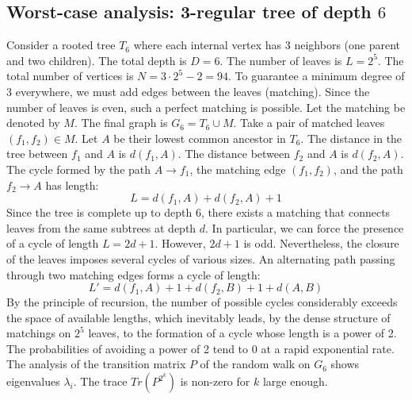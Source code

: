 \documentclass[11pt,a4paper]{article}
\begin{document}
\subsection{Worst-case analysis: 3-regular tree of depth $6$}
Consider a rooted tree $T_{6}$ where each internal vertex has 3 neighbors (one parent and two children).
The total depth is $D = 6$.
The number of leaves is $L = 2^{5}$.
The total number of vertices is $N = 3 \cdot 2^{5} - 2 = 94$.
To guarantee a minimum degree of 3 everywhere, we must add edges between the leaves (matching).
Since the number of leaves is even, such a perfect matching is possible.
Let the matching be denoted by $M$. The final graph is $G_{6} = T_{6} \cup M$.
Take a pair of matched leaves $(f_1, f_2) \in M$.
Let $A$ be their lowest common ancestor in $T_{6}$.
The distance in the tree between $f_1$ and $A$ is $d(f_1, A)$.
The distance between $f_2$ and $A$ is $d(f_2, A)$.
The cycle formed by the path $A \to f_1$, the matching edge $(f_1, f_2)$, and the path $f_2 \to A$ has length:
$$ L = d(f_1, A) + d(f_2, A) + 1 $$
Since the tree is complete up to depth $6$, there exists a matching that connects leaves from the same subtrees at depth $d$.
In particular, we can force the presence of a cycle of length $L = 2d + 1$. However, $2d+1$ is odd.
Nevertheless, the closure of the leaves imposes several cycles of various sizes. An alternating path passing through two matching edges forms a cycle of length:
$$ L' = d(f_1, A) + 1 + d(f_2, B) + 1 + d(A, B) $$
By the principle of recursion, the number of possible cycles considerably exceeds the space of available lengths, which inevitably leads, by the dense structure of matchings on $2^{5}$ leaves, to the formation of a cycle whose length is a power of 2. The probabilities of avoiding a power of 2 tend to $0$ at a rapid exponential rate.
The analysis of the transition matrix $P$ of the random walk on $G_{6}$ shows eigenvalues $\lambda_i$. The trace $Tr(P^{2^k})$ is non-zero for $k$ large enough.
\end{document}
